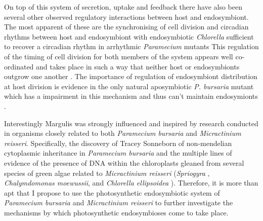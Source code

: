 On top of this system of secretion, uptake and feedback there have also been several other observed regulatory interactions between host and endosymbiont.  
The most apparent of these are the synchronising of cell division and circadian rhythms between host and endosymbiont \citep{Miwa1996} with endosymbiotic \textit{Chlorella} sufficient to recover a circadian rhythm in arrhythmic \textit{Paramecium} mutants \citep{Miwa2009}
This regulation of the timing of cell division for both members of the system appears well co-ordinated and takes place in such a way that neither host or endosymbionts outgrow one another \citep{Kadono2004,Takahashi2007}.
The importance of regulation of endosymbiont distribution at host division is evidence in the only natural aposymbiotic \textit{P. bursaria} mutant which
has a impairment in this mechanism and thus can't maintain endosymionts \citep{Tonooka2002}. %




Interestingly Margulis was strongly influenced and inspired by research conducted
in organisms closely related to both \textit{Paramecium bursaria} and 
\textit{Micractinium reisseri}. Specifically, the discovery of Tracey Sonneborn
of non-mendelian cytoplasmic inheritance in \textit{Paramecium bursaria} \citep{Sonneborn1950}
and the multiple lines of evidence of the presence of DNA within the chloroplasts
gleaned from several species of green algae related to \textit{Micractinium reisseri}
(\textit{Spriogyra} \citep{Stocking1959}, \textit{Chalymdomonas moewussii}, and 
\textit{Chlorella ellipsoidea} \cite{Ris1962}).  Therefore, it is more than apt
that I propose to use the photosynthetic endosymbiotic system of \textit{Paramecium bursaria}
and \textit{Micractinium reisseri} to further investigate the mechanisms by which
photosynthetic endosymbioses come to take place.





